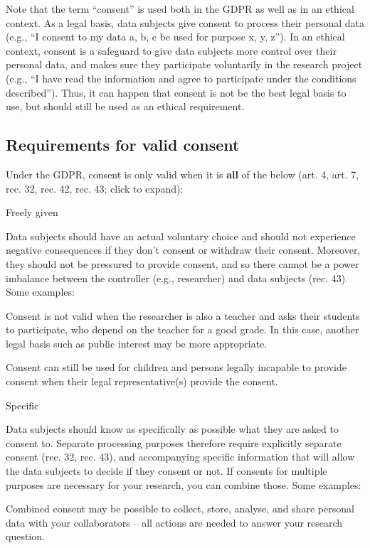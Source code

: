 \documentclass[
]{book}
\begin{document}
Note that the term ``consent'' is used both in the GDPR as well as in an ethical
context. As a legal basis, data subjects give consent
to process their personal data (e.g., ``I consent to my data a, b, c be used for
purpose x, y, z''). In an ethical context, consent is a
safeguard
to give data subjects more control over their personal data, and makes sure they
participate voluntarily in the research project (e.g., ``I have read the
information and agree to participate under the conditions described''). Thus, it
can happen that consent is not be the best legal basis to use, but should still
be used as an ethical requirement.

\hypertarget{consent-requirements}{%
\subsection{Requirements for valid consent}\label{consent-requirements}}

Under the GDPR, consent is only valid when it is \textbf{all} of the below
(art. 4,
art. 7,
rec. 32,
rec. 42,
rec. 43;
click to expand):

Freely given

Data subjects should have an actual voluntary choice and should not experience
negative consequences if they don't consent or withdraw their consent. Moreover,
they should not be pressured to provide consent, and so there cannot be a power
imbalance between the controller (e.g., researcher) and data subjects
(rec. 43).
Some examples:

Consent is not valid when the researcher is also a teacher and asks their
students to participate, who depend on the teacher for a good grade. In this
case, another legal basis such as public interest may be more appropriate.

Consent can still be used for children and persons legally incapable to
provide consent when their legal representative(s) provide the consent.

Specific

Data subjects should know as specifically as possible what they are asked to
consent to. Separate processing purposes therefore require explicitly separate
consent (rec. 32,
rec. 43), and
accompanying specific information that will allow the data subjects to decide
if they consent or not. If consents for multiple purposes are necessary for your
research, you can combine those.
Some examples:

Combined consent may be possible to collect, store, analyse, and share
personal data with your collaborators -- all actions are needed to answer your
research question.
\end{document}
